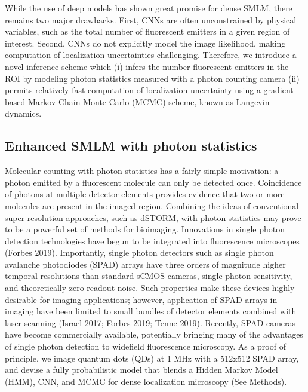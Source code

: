 \documentclass{ucetd}
\begin{document}
While the use of deep models has shown great promise for dense SMLM, there remains two major drawbacks. First, CNNs are often unconstrained by physical variables, such as the total number of fluorescent emitters in a given region of interest. Second, CNNs do not explicitly model the image likelihood, making computation of localization uncertainties challenging. Therefore, we introduce a novel inference scheme which (i) infers the number fluorescent emitters in the ROI by modeling photon statistics measured with a photon counting camera (ii) permits relatively fast computation of localization uncertainty using a gradient-based Markov Chain Monte Carlo (MCMC) scheme, known as Langevin dynamics.

\subsection{Enhanced SMLM with photon statistics}

Molecular counting with photon statistics has a fairly simple motivation: a photon emitted by a fluorescent molecule can only be detected once. Coincidence of photons at multiple detector elements provides evidence that two or more molecules are present in the imaged region. Combining the ideas of conventional super-resolution approaches, such as dSTORM, with photon statistics may prove to be a powerful set of methods for bioimaging. Innovations in single photon detection technologies have begun to be integrated into fluorescence microscopes (Forbes 2019). Importantly, single photon detectors such as single photon avalanche photodiodes (SPAD) arrays have three orders of magnitude higher temporal resolutions than standard sCMOS cameras, single photon sensitivity, and theoretically zero readout noise. Such properties make these devices highly desirable for imaging applications; however, application of SPAD arrays in imaging have been limited to small bundles of detector elements combined with laser scanning (Israel 2017; Forbes 2019; Tenne 2019). Recently, SPAD cameras have become commercially available, potentially bringing many of the advantages of single photon detection to widefield fluorescence microscopy. As a proof of principle, we image quantum dots (QDs) at 1 MHz with a 512x512 SPAD array, and devise a fully probabilistic model that blends a Hidden Markov Model (HMM), CNN, and MCMC for dense localization microscopy (See Methods).
\end{document}
